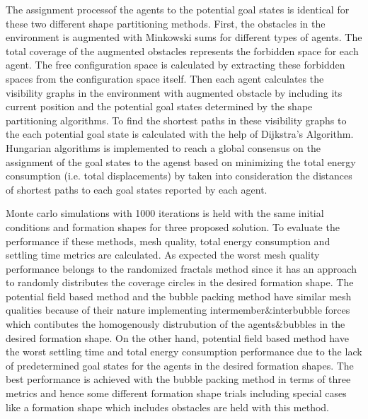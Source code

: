 \documentclass[twoside]{article}
\begin{document}
       The assignment processof the agents to the potential goal states is identical for these two different shape partitioning methods. First, the obstacles in the environment is augmented with Minkowski sums for different types of agents. The total coverage of the augmented obstacles represents the forbidden space for each agent. The free configuration space is calculated by extracting these forbidden spaces from the configuration space itself. Then each agent calculates the visibility graphs in the environment with augmented obstacle by including its current position and the potential goal states determined by the shape partitioning algorithms. To find the shortest paths in these visibility graphs to the each potential goal state is calculated with the help of Dijkstra's Algorithm. Hungarian algorithms is implemented to reach a global consensus on the assignment of the goal states to the agenst based on minimizing the total energy consumption (i.e. total displacements) by taken into consideration the distances of shortest paths to each goal states reported by each agent. 
       
       Monte carlo simulations with 1000 iterations is held with the same initial conditions and formation shapes for three proposed solution. To evaluate the performance if these methods, mesh quality, total energy consumption and settling time metrics are calculated. As expected the worst mesh quality performance belongs to the randomized fractals method since it has an approach to randomly distributes the coverage circles in the desired formation shape. The potential field based method and the bubble packing method have similar mesh qualities because of their nature implementing intermember$\&$interbubble forces which contibutes the homogenously distrubution of the agents$\&$bubbles in the desired formation shape. On the other hand, potential field based method have the worst settling time and total energy consumption performance due to the lack of predetermined goal states for the agents in the desired formation shapes. The best performance is achieved with the bubble packing method in terms of three metrics and hence some different formation shape trials including special cases like a formation shape which includes obstacles are held with this method. 
       
\end{document}

